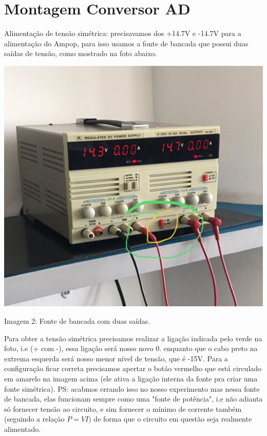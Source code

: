 \documentclass{article}
\begin{document}


\section{Montagem Conversor AD}
Alimentação de tensão simétrica: precisavamos dos +14.7V e -14.7V para a alimentação do Ampop, para isso usamos a fonte de bancada que possui duas saídas de tensão, como mostrado na foto abaixo.
\begin{center}
    \includegraphics[scale=0.2]{images/fonte.jpeg}
    
    Imagem 2: Fonte de bancada com duas saídas.
\end{center}

Para obter a tensão simétrica precisamos realizar a ligação indicada pelo verde na foto, i.e (+ com -), essa ligação será nosso novo 0. enquanto que o cabo preto na extrema esquerda será nosso menor nível de tensão, que é -15V. Para a configuração ficar correta precisamos apertar o botão vermelho que está circulado em amarelo na imagem acima (ele ativa a ligação interna da fonte pra criar uma fonte simétrica). PS: acabmos errando isso no nosso experimento mas nessa fonte de bancada, elas funcionam sempre como uma "fonte de potência", i.e não adianta só fornecer tensão ao circuito, e sim fornecer o mínimo de corrente também (seguindo a relação $P=VI$) de forma que o circuito em questão seja realmente alimentado.
\end{document}
